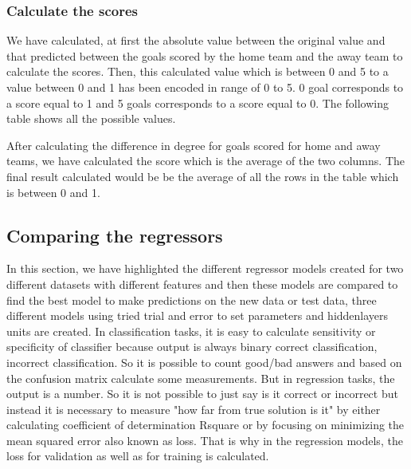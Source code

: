 \subsubsection{Calculate the scores}

We have calculated, at first the absolute value between the original value 
and that predicted between the goals scored by the home team and the away team to calculate the scores.
Then, this calculated value which is between 0 and 5 to a value between 0 and 1 has been encoded in range of 0 to 5. 
0 goal corresponds to a score equal to 1 and 5 goals corresponds to a score equal to 0.
The following table shows all the possible values.


\begin{table}[H]
    \centering
    \caption{Calculate the degree difference}
    \label{table:qualitycriteriaround}
\end{table}

After calculating the difference in degree for goals scored for home and away teams, we have calculated the score which is the average of the two columns. The final result calculated would be be the average of all the rows in the table which is between 0 and 1.

\subsection{Comparing the regressors}
In this section, we have highlighted the different regressor models created for two different datasets with different features and then these models are compared to find the best model to make predictions on the new data or test data, three different models using tried trial and error to set parameters and hiddenlayers units are created.\newline 
In classification tasks, it is easy to calculate sensitivity or specificity of classifier because output is always binary {correct classification, incorrect classification}. So it is possible to count good/bad answers and based on the confusion matrix calculate some measurements. But in regression tasks, the output is a number. So it is not possible to just say is it correct or incorrect but instead it is necessary to measure "how far from true solution is it" by either calculating coefficient of determination Rsquare or by focusing on minimizing the mean squared error also known as loss. That is why in the regression models, the loss for validation as well as for training is calculated.
